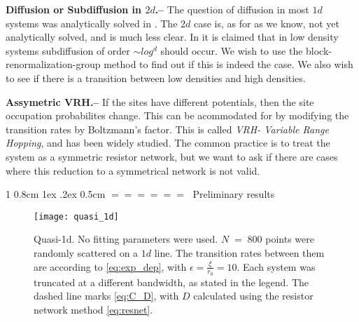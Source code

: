 \documentclass[onecolumn,fleqn,notitlepage,secnumarabic]{revtex4}
\makeatletter
\def\section{%
  \@startsection
    {section}%
    {1}%
    {\z@}%
    {0.8cm \@plus1ex \@minus .2ex}%
    {0.5cm}%
    {\Large\bf $=\!=\!=\!=\!=\!=\;$}%
}%
\makeatother
\begin{document}
{ \bf Diffusion or Subdiffusion in $2d$.-- } The question of diffusion in most $1d$ systems was analytically solved in \cite{Alexander:1981:RMP}. The $2d$ case is, as for as we know, not yet analytically solved, and is much less clear. In \cite{Amir:2010:PRL} it is claimed that in low density systems subdiffusion of order $\sim log^d$ should occur. We wish to use the block-renormalization-group method to find out if this is indeed the case. We also wish to see if there is a transition between low densities and high densities.

{\bf Assymetric VRH.--} If the sites have different potentials, then the site occupation probabilites change. This can be acommodated for by modifying the transition rates by Boltzmann's factor. This is called \emph{VRH- Variable Range Hopping}\cite{Ambegaokar:1971}, and has been widely studied. The common practice is to treat the system as a symmetric resistor network, but we want to ask if there are cases where this reduction to a symmetrical network is not valid.

\section{Preliminary results} \label{sec:prelim}


\begin{figure}
    \texttt{[image: quasi\_1d]}
    \caption{Quasi-1d. No fitting parameters were used. $N\;=\;800$ points were randomly scattered on a $1d$ line. The transition rates between them are according to \autoref{eq:exp_dep}, with $\epsilon=\frac{\xi}{r_0}=10$. Each system was truncated at a different bandwidth, as stated in the legend. The dashed line marks \autoref{eq:C_D}, with $D$ calculated using the resistor network method \autoref{eq:resnet}. }
    \label{fig:quasi_1d}
\end{figure}
\end{document}
